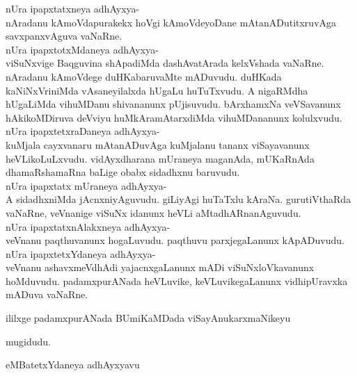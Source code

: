 \documentclass{article}
\begin{document}
nUra ipapxtatxneya adhAyxya-\\
nAradanu kAmoVdapurakekx hoVgi kAmoVdeyoDane mAtanADutitxruvAga savxpanxvAguva vaNaRne.\\
nUra ipapxtotxMdaneya adhAyxya-\\
viSuNxvige Baqguvina shApadiMda dashAvatArada kelxVshada vaNaRne. nAradanu kAmoVdege duHKabaruvaMte mADuvudu. duHKada kaNiNxVriniMda vAsaneyilalxda hUgaLu huTuTxvudu. A nigaRMdha hUgaLiMda vihuMDanu shivananunx pUjisuvudu. bArxhamxNa veVSavanunx hAkikoMDiruva deVviyu huMkAramAtarxdiMda vihuMDananunx kolulxvudu.\\
nUra ipapxtetxraDaneya adhAyxya-\\
kuMjala cayxvanaru mAtanADuvAga kuMjalanu tananx viSayavanunx heVLikoLuLxvudu. vidAyxdharana mUraneya maganAda, mUKaRnAda dhamaRshamaRna baLige obabx sidadhxnu baruvudu.\\
nUra ipapxtatx mUraneya adhAyxya-\\
A sidadhxniMda jAcnxniyAguvudu. giLiyAgi huTaTxlu kAraNa. gurutiVthaRda vaNaRne, veVnanige viSuNx idanunx heVLi aMtadhARnanAguvudu.\\
nUra ipapxtatxnAlakxneya adhAyxya-\\
veVnanu paqthuvanunx hogaLuvudu. paqthuvu parxjegaLanunx kApADuvudu.\\
nUra ipapxtetxYdaneya adhAyxya-\\
veVnanu ashavxmeVdhAdi yajacnxgaLanunx mADi viSuNxloVkavanunx hoMduvudu. padamxpurANada heVLuvike, keVLuvikegaLanunx vidhipUravxka mADuva vaNaRne.
\begin{center}
ililxge padamxpurANada BUmiKaMDada viSayAnukarxmaNikeyu
\end{center}

\begin{center}
mugidudu.
\end{center}

\begin{center}
eMBatetxYdaneya adhAyxyavu
\end{center}
\end{document}

